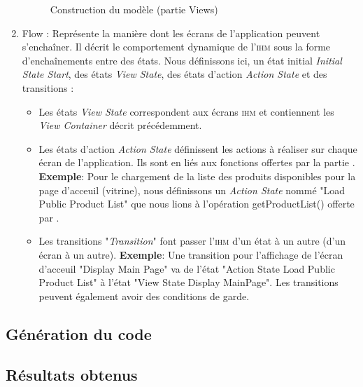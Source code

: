 \begin{enumerate}
\begin{figure}[H]
  \caption{Construction du modèle (partie Views)}
  \label{fig:Construction du modèle (partie Views)}
\end{figure}
\item Flow : Représente la manière dont les écrans de l'application peuvent s'enchaîner. Il décrit le comportement dynamique de l'\textsc{ihm} sous la forme d'enchaînements entre des états. Nous définissons ici, un état initial \textit{Initial State Start}, des états \textit{View State}, des états d'action \textit{Action State} et des transitions :
\begin{itemize}
\item Les états \textit{View State} correspondent aux écrans \textsc{ihm} et contiennent les \textit{View Container} décrit précédemment.
\item Les états d'action \textit{Action State} définissent les actions à réaliser sur chaque écran de l'application. Ils sont en liés aux fonctions offertes par la partie \kwsoa{}. 
\newline
\textbf{Exemple}: Pour le chargement de la liste des produits disponibles pour la page d'acceuil (vitrine), nous définissons un \textit{Action State} nommé "Load Public Product List" que nous lions à l'opération getProductList() offerte par \kwsoa{}.  
\item Les transitions "\textit{Transition}" font passer l'\textsc{ihm} d'un état à un autre (d'un écran à un autre). 
\newline
\textbf{Exemple}: Une transition pour l'affichage de l'écran d'acceuil "Display Main Page" va de l'état "Action State Load Public Product List" à l'état "View State Display MainPage".
\newline
Les transitions peuvent également avoir des conditions de garde.
\end{itemize}
\end{enumerate}				
\subsection{Génération du code}

\subsection{Résultats obtenus}
